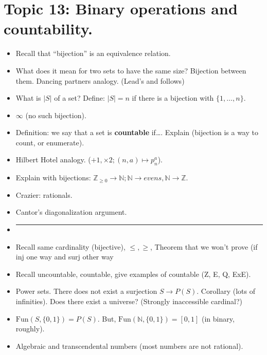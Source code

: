 \documentclass[12pt]{article}
\begin{document}
\newpage
\section[13 (\csname dateWeek13\endcsname): Binary operations and countability ]{Topic  13: Binary operations and countability.}

\begin{itemize}
\item Recall that ``bijection'' is an equivalence relation. 
\item What does it mean for two sets to have the same size? Bijection between them. Dancing partners analogy. (Lead's and follows)
\item What is $|S|$ of a set? Define: $|S| = n$ if there is a bijection with $\{1,\ldots,n\}$. 
\item $\infty$ (no such bijection). 
\item Definition: we say that a set is \textbf{countable} if\ldots. Explain (bijection is a way to count, or enumerate). 
\item Hilbert Hotel analogy. ($+1, \times 2; (n,a) \mapsto p_n^a$).
\item Explain with bijections: $\mathbb{Z}_{\geq 0} \to \mathbb{N}; \mathbb{N} \to evens, \mathbb{N} \to \mathbb{Z}$. 
\item Crazier: rationals. 
\item Cantor's diagonalization argument.
\item []       \vspace{0.1cm}\hrule\vspace{-0.4cm}   
\item Recall same cardinality (bijective), $\le, \ge$, Theorem that we won't prove (if inj one way and surj other way
\item Recall uncountable, countable, give examples of countable (Z, E, Q, ExE). 
\item Power sets. There does not exist a surjection $S \to P(S)$. Corollary (lots of infinities). Does there exist a universe? (Strongly inaccessible cardinal?)
\item $\text{Fun}(S, \{0,1\}) = P(S)$. But, $\text{Fun}(\mathbb{N}, \{0,1\}) = [0,1]$ (in binary, roughly). 

\item Algebraic and transcendental numbers (most numbers are not rational).
  
\end{itemize}
\end{document}
